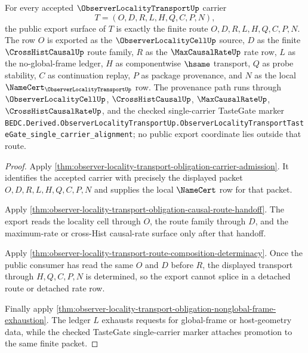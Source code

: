 \begin{theorem}
\label{thm:observer-locality-transport-public-export}
For every accepted $\ObserverLocalityTransportUp$ carrier
$$
T=(O,D,R,L,H,Q,C,P,N),
$$
the public export surface of $T$ is exactly the finite route $O,D,R,L,H,Q,C,P,N$. The row $O$ is exported as the $\ObserverLocalityCellUp$ source, $D$ as the finite $\CrossHistCausalUp$ route family, $R$ as the $\MaxCausalRateUp$ rate row, $L$ as the no-global-frame ledger, $H$ as componentwise $\hsame$ transport, $Q$ as probe stability, $C$ as continuation replay, $P$ as package provenance, and $N$ as the local $\NameCert_{\ObserverLocalityTransportUp}$ row. The provenance path runs through $\ObserverLocalityCellUp$, $\CrossHistCausalUp$, $\MaxCausalRateUp$, $\CrossHistCausalRateUp$, and the checked single-carrier TasteGate marker \texttt{BEDC.Derived.ObserverLocalityTransportUp.ObserverLocalityTransportTasteGate\_single\_carrier\_alignment}; no public export coordinate lies outside that route.
\end{theorem}
\begin{proof}
Apply \autoref{thm:observer-locality-transport-obligation-carrier-admission}. It identifies the accepted carrier with precisely the displayed packet $O,D,R,L,H,Q,C,P,N$ and supplies the local $\NameCert$ row for that packet.

Apply \autoref{thm:observer-locality-transport-obligation-causal-route-handoff}. The export reads the locality cell through $O$, the route family through $D$, and the maximum-rate or cross-Hist causal-rate surface only after that handoff.

Apply \autoref{thm:observer-locality-transport-route-composition-determinacy}. Once the public consumer has read the same $O$ and $D$ before $R$, the displayed transport through $H,Q,C,P,N$ is determined, so the export cannot splice in a detached route or detached rate row.

Finally apply \autoref{thm:observer-locality-transport-obligation-nonglobal-frame-exhaustion}. The ledger $L$ exhausts requests for global-frame or host-geometry data, while the checked TasteGate single-carrier marker attaches promotion to the same finite packet.
\end{proof}


